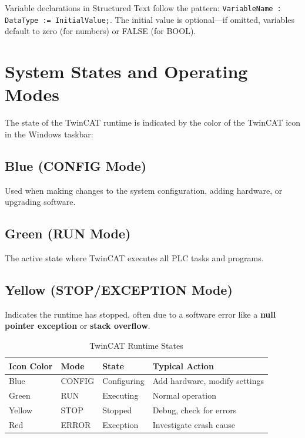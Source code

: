 \documentclass[11pt,a4paper]{article}
\begin{document}
\begin{notebox}
Variable declarations in Structured Text follow the pattern: \texttt{VariableName : DataType := InitialValue;}. The initial value is optional---if omitted, variables default to zero (for numbers) or FALSE (for BOOL).
\end{notebox}

\section{System States and Operating Modes}

The state of the TwinCAT runtime is indicated by the color of the TwinCAT icon in the Windows taskbar:

\subsection{Blue (CONFIG Mode)}

Used when making changes to the system configuration, adding hardware, or upgrading software.

\subsection{Green (RUN Mode)}

The active state where TwinCAT executes all PLC tasks and programs.

\subsection{Yellow (STOP/EXCEPTION Mode)}

Indicates the runtime has stopped, often due to a software error like a \textbf{null pointer exception} or \textbf{stack overflow}.

\begin{table}[h]
\centering
\begin{tabular}{@{}llll@{}}
\toprule
\textbf{Icon Color} & \textbf{Mode} & \textbf{State} & \textbf{Typical Action} \\
\midrule
Blue & CONFIG & Configuring & Add hardware, modify settings \\
Green & RUN & Executing & Normal operation \\
Yellow & STOP & Stopped & Debug, check for errors \\
Red & ERROR & Exception & Investigate crash cause \\
\bottomrule
\end{tabular}
\caption{TwinCAT Runtime States}
\end{table}
\end{document}
